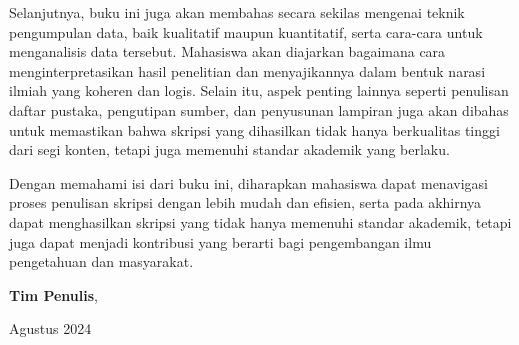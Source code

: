 \documentclass[
  letterpaper,
  DIV=11,
  numbers=noendperiod]{scrreprt}
\begin{document}
Selanjutnya, buku ini juga akan membahas secara sekilas mengenai teknik
pengumpulan data, baik kualitatif maupun kuantitatif, serta cara-cara
untuk menganalisis data tersebut. Mahasiswa akan diajarkan bagaimana
cara menginterpretasikan hasil penelitian dan menyajikannya dalam bentuk
narasi ilmiah yang koheren dan logis. Selain itu, aspek penting lainnya
seperti penulisan daftar pustaka, pengutipan sumber, dan penyusunan
lampiran juga akan dibahas untuk memastikan bahwa skripsi yang
dihasilkan tidak hanya berkualitas tinggi dari segi konten, tetapi juga
memenuhi standar akademik yang berlaku.

Dengan memahami isi dari buku ini, diharapkan mahasiswa dapat menavigasi
proses penulisan skripsi dengan lebih mudah dan efisien, serta pada
akhirnya dapat menghasilkan skripsi yang tidak hanya memenuhi standar
akademik, tetapi juga dapat menjadi kontribusi yang berarti bagi
pengembangan ilmu pengetahuan dan masyarakat.

\hfill\break

\textbf{Tim Penulis},

Agustus 2024
\end{document}
